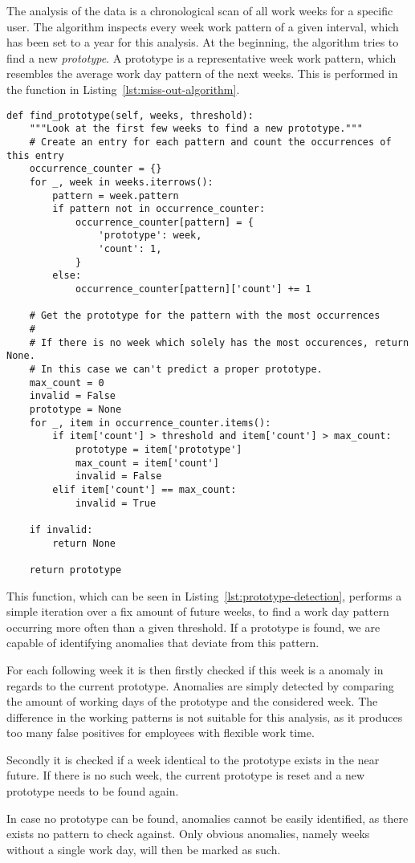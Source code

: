 The analysis of the data is a chronological scan of all work weeks for a specific user.
The algorithm inspects every week work pattern of a given interval, which has been set to a year for this analysis.
At the beginning, the algorithm tries to find a new \emph{prototype}.
A prototype is a representative week work pattern, which resembles the average work day pattern of the next weeks.
This is performed in the function  in Listing~\ref{lst:miss-out-algorithm}.


\begin{verbatim}
def find_prototype(self, weeks, threshold):
    """Look at the first few weeks to find a new prototype."""
    # Create an entry for each pattern and count the occurrences of this entry
    occurrence_counter = {}
    for _, week in weeks.iterrows():
        pattern = week.pattern
        if pattern not in occurrence_counter:
            occurrence_counter[pattern] = {
                'prototype': week,
                'count': 1,
            }
        else:
            occurrence_counter[pattern]['count'] += 1

    # Get the prototype for the pattern with the most occurrences
    #
    # If there is no week which solely has the most occurences, return None.
    # In this case we can't predict a proper prototype.
    max_count = 0
    invalid = False
    prototype = None
    for _, item in occurrence_counter.items():
        if item['count'] > threshold and item['count'] > max_count:
            prototype = item['prototype']
            max_count = item['count']
            invalid = False
        elif item['count'] == max_count:
            invalid = True

    if invalid:
        return None

    return prototype
\end{verbatim}
\begingroup
{}\label{lst:prototype-detection}
\endgroup

This function, which can be seen in Listing~\ref{lst:prototype-detection}, performs a simple iteration over a fix amount of future weeks, to find a work day pattern occurring more often than a given threshold.
If a prototype is found, we are capable of identifying anomalies that deviate from this pattern.

For each following week it is then firstly checked if this week is a anomaly in regards to the current prototype.
Anomalies are simply detected by comparing the amount of working days of the prototype and the considered week.
The difference in the working patterns is not suitable for this analysis, as it produces too many false positives for employees with flexible work time.

Secondly it is checked if a week identical to the prototype exists in the near future.
If there is no such week, the current prototype is reset and a new prototype needs to be found again.

In case no prototype can be found, anomalies cannot be easily identified, as there exists no pattern to check against.
Only obvious anomalies, namely weeks without a single work day, will then be marked as such.
